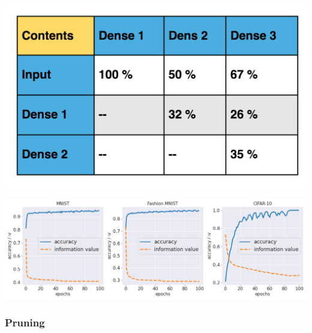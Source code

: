 \documentclass{article}
\begin{document}
\begin{minipage}{.45\textwidth}
    \centering
    \includegraphics[scale=0.13]{SampleTable.png}
    \label{fig:DSC.png}
\end{minipage}
\begin{minipage}{.45\textwidth}
    \centering
    \includegraphics[scale=0.13]{iv.png}
    \label{fig:DSC.png}
\end{minipage}

\subsubsection{Pruning}
\end{document}
